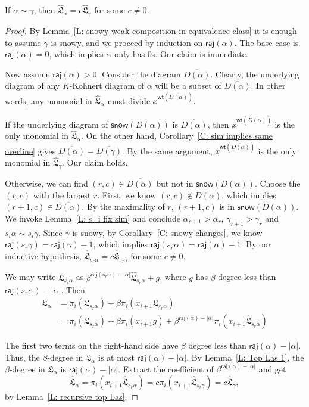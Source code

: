 \documentclass[ALCO]{cedram}
\newenvironment{manuallemma}[1]{
  \renewcommand\themanuallemmainner{#1}
  \manuallemmainner
}{\endmanuallemmainner}
\newcommand{\fL}{\mathfrak{L}}
\newcommand{\fLb}{\fL}
\newcommand{\topLas}{\widehat{\fL}}
\newcommand{\wt}{\mathsf{wt}}
\newcommand{\snow}{\mathsf{snow}}
\newcommand{\raj}{\mathsf{raj}}
\begin{document}
\begin{manuallemma}{\ref{L: Top Las similar}}
If $\alpha \sim \gamma$, 
then $\topLas_\alpha = c\topLas_\gamma$ for some $c \neq 0$.
\end{manuallemma}
\begin{proof}
By Lemma~\ref{L: snowy weak composition in equivalence class} 
it is enough to assume $\gamma$ is snowy, and we proceed by induction on $\raj(\alpha)$.
The base case is $\raj(\alpha) = 0$,
which implies $\alpha$ only has 0s. 
Our claim is immediate. 

Now assume $\raj(\alpha) > 0$.
Consider the diagram $\overline{D(\alpha)}$.
Clearly, the underlying diagram of any $K$-Kohnert diagram
of $\alpha$ will be a subset of $\overline{D(\alpha)}$.
In other words, any monomial in $\topLas_{\alpha}$
must divide $x^{\wt(\overline{D(\alpha)})}$.

If the underlying diagram of $\snow(D(\alpha))$
is $\overline{D(\alpha)}$, 
then $x^{\wt(\overline{D(\alpha)})}$ is the only monomial
in $\topLas_{\alpha}$.
On the other hand, 
Corollary~\ref{C: sim implies same overline} gives
$\overline{D(\alpha)} = \overline{D(\gamma)}$.
By the same argument, $x^{\wt(\overline{D(\alpha)})}$ is the only monomial
in $\topLas_{\gamma}$.
Our claim holds. 

Otherwise, we can find $(r,c) \in \overline{D(\alpha)}$
but not in $\snow(D(\alpha))$.
Choose the $(r,c)$ with the largest $r$.
First, we know $(r,c) \notin D(\alpha)$,
which implies $(r+1, c) \in \overline{D(\alpha)}$.
By the maximality of $r$,
$(r+1, c)$ is in $\snow(D(\alpha))$.
We invoke Lemma~\ref{L: s_i fix sim}
and conclude $\alpha_{r+1} > \alpha_{r}$,
$\gamma_{r+1} > \gamma_{r}$
and $s_i \alpha \sim s_i \gamma$.
Since $\gamma$ is snowy,
by Corollary~\ref{C: snowy changes},
we know $\raj(s_r \gamma) = \raj(\gamma) - 1$,
which implies $\raj(s_r \alpha) = \raj(\alpha) - 1$.
By our inductive hypothesis, 
$\topLas_{s_r \alpha} = c \topLas_{s_r \gamma}$
for some $c \neq 0$.

We may write 
$\fLb_{s_r \alpha}$ 
as $\beta^{\raj(s_r \alpha) - |\alpha|}\topLas_{s_r \alpha} + g$,
where $g$ has $\beta$-degree less than  
$\raj(s_r \alpha) - |\alpha|$.
Then 
\begin{align*}
\fLb_\alpha 
& = \pi_i(\fLb_{s_r \alpha}) + \beta \pi_i(x_{i+1}\fLb_{s_r \alpha})\\
& = \pi_i(\fLb_{s_r \alpha}) + \beta \pi_i(x_{i+1} g) + \beta^{\raj(\alpha) - |\alpha|} \pi_i(x_{i+1} \topLas_{s_r \alpha})    
\end{align*}

The first two terms on the right-hand side have $\beta$ degree 
less than $\raj(\alpha) - |\alpha|$.
Thus, the $\beta$-degree in $\fLb_\alpha$ is at most $\raj(\alpha) - |\alpha|$.
By Lemma~\ref{L: Top Las 1},
the $\beta$-degree in $\fLb_\alpha$ is $\raj(\alpha) - |\alpha|$.
Extract the coefficient of $\beta^{\raj(\alpha) - |\alpha|}$ and get
$$
\topLas_\alpha = \pi_i(x_{i+1} \topLas_{s_r \alpha}) = c\pi_i(x_{i+1} \topLas_{s_r \gamma}) = c\topLas_{\gamma},
$$
by Lemma~\ref{L: recursive top Las}.
\end{proof}
\end{document}
